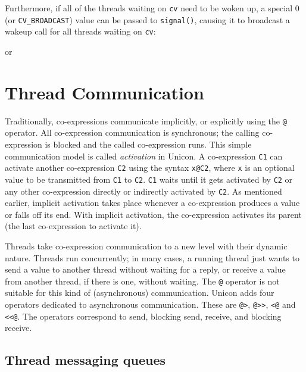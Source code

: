 Furthermore, if all of the threads waiting on \texttt{cv} need to be woken up, a
special 0 (or \texttt{CV\_BROADCAST}) value can be passed to \texttt{signal()},
causing it to broadcast a wakeup call for all threads waiting on \texttt{cv}:


or




\section{Thread Communication}

Traditionally, co-expressions communicate implicitly, or explicitly using the
\texttt{@} operator.  All co-expression communication is synchronous; the
calling co-expression is blocked and the called co-expression runs.  This simple
communication model is called \emph{activation} in Unicon.  A co-expression
\texttt{C1} can activate another co-expression \texttt{C2} using the syntax
\texttt{x@C2}, where \texttt{x} is an optional value to be transmitted from
\texttt{C1} to \texttt{C2}.  \texttt{C1} waits until it gets activated by
\texttt{C2} or any other co-expression directly or indirectly activated by
\texttt{C2}.  As mentioned earlier, implicit activation takes place whenever a
co-expression produces a value or falls off its end. With implicit activation,
the co-expression activates its parent (the last co-expression to activate it).

Threads take co-expression communication to a new level with their dynamic
nature. Threads run concurrently; in many cases, a running thread just wants to
send a value to another thread without waiting for a reply, or receive a value
from another thread, if there is one, without waiting.  The \texttt{@} operator
is not suitable for this kind of (asynchronous) communication.  Unicon adds four
operators dedicated to asynchronous communication. These are \texttt{@>},
\texttt{@>{}>}, \texttt{<@} and \texttt{<{}<@}. The operators correspond to send,
blocking send, receive, and blocking receive.

\subsection*{Thread messaging queues}

